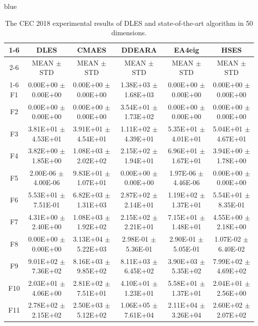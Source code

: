 \documentclass[journal, onecolumn]{IEEEtran}
\begin{document}
\begin{color}{blue}
\begin{table}[htbp!]
	\centering
	\caption{The CEC 2018 experimental results of DLES and state-of-the-art algorithm in 50 dimensions.}
	\label{CEC2018_50}
		\begin{tabular}{c|ccccc}
			\cline{1-6}
				 &	DLES			 &	CMAES				 &	DDEARA				 &	EA4eig				 &	HSES			\\	\cline{2-6}	
			&	MEAN	$\pm$	STD	 &	MEAN	$\pm$	STD		 &	MEAN	$\pm$	STD		 &	MEAN	$\pm$	STD		 &	MEAN	$\pm$	STD	\\	\cline{1-6}
			F1	 &	0.00E+00	$\pm$	0.00E+00	 &	0.00E+00	$\pm$	0.00E+00		 &	1.38E+03	$\pm$	1.68E+03		 &	0.00E+00	$\pm$	0.00E+00		 &	0.00E+00	$\pm$	0.00E+00	\\	
			F2	 &	0.00E+00	$\pm$	0.00E+00	 &	0.00E+00	$\pm$	0.00E+00		 &	3.54E+01	$\pm$	1.73E+02		 &	0.00E+00	$\pm$	0.00E+00		 &	0.00E+00	$\pm$	0.00E+00	\\	
			F3	 &	3.81E+01	$\pm$	4.53E+01	 &	3.91E+01	$\pm$	4.54E+01		 &	1.11E+02	$\pm$	4.39E+01		 &	5.35E+01	$\pm$	4.01E+01		 &	5.04E+01	$\pm$	4.67E+01	\\	
			F4	 &	3.82E+00	$\pm$	1.85E+00	 &	1.08E+03	$\pm$	2.02E+02		 &	2.15E+02	$\pm$	1.94E+01		 &	6.96E+01	$\pm$	1.67E+01		 &	3.94E+00	$\pm$	1.78E+00	\\	
			F5	 &	2.00E-06	$\pm$	4.00E-06	 &	9.83E+01	$\pm$	1.07E+01		 &	0.00E+00	$\pm$	0.00E+00		 &	1.97E-06	$\pm$	4.46E-06		 &	0.00E+00	$\pm$	0.00E+00	\\	
			F6	 &	5.53E+01	$\pm$	7.51E-01	 &	6.82E+03	$\pm$	1.31E+03		 &	2.87E+02	$\pm$	2.14E+01		 &	1.19E+02	$\pm$	1.37E+01		 &	5.54E+01	$\pm$	8.35E-01	\\	
			F7	 &	4.31E+00	$\pm$	2.40E+00	 &	1.08E+03	$\pm$	1.92E+02		 &	2.15E+02	$\pm$	2.21E+01		 &	7.15E+01	$\pm$	1.48E+01		 &	4.55E+00	$\pm$	2.18E+00	\\	
			F8	 &	0.00E+00	$\pm$	0.00E+00	 &	3.13E+04	$\pm$	5.22E+03		 &	2.98E-01	$\pm$	5.36E-01		 &	2.90E-01	$\pm$	5.05E-01		 &	1.07E-02	$\pm$	6.40E-02	\\	
			F9	 &	9.01E+02	$\pm$	7.36E+02	 &	8.16E+03	$\pm$	9.85E+02		 &	8.11E+03	$\pm$	6.45E+02		 &	3.90E+03	$\pm$	5.35E+02		 &	7.99E+02	$\pm$	4.69E+02	\\	
			F10	 &	2.03E+01	$\pm$	4.06E+00	 &	2.81E+02	$\pm$	7.51E+01		 &	4.10E+01	$\pm$	1.23E+01		 &	5.58E+01	$\pm$	1.37E+01		 &	2.04E+01	$\pm$	2.56E+00	\\	
			F11	 &	2.78E+02	$\pm$	2.15E+02	 &	2.50E+03	$\pm$	5.12E+02		 &	1.06E+05	$\pm$	7.61E+04		 &	2.11E+04	$\pm$	3.26E+04		 &	2.60E+02	$\pm$	2.07E+02	\\	

\end{tabular}
\end{table}
\end{color}
\end{document}

